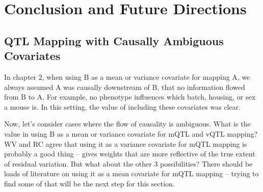 \chapter{Conclusion and Future Directions}

\section{QTL Mapping with Causally Ambiguous Covariates}

In chapter 2, when using B as a mean or variance covariate for mapping A, we always assumed A was causally downstream of B, that no information flowed from B to A.
For example, no phenotype influences which batch, housing, or sex a mouse is.
In this setting, the value of including these covariates was clear.

Now, let's consider cases where the flow of causality is ambiguous.
What is the value in using B as a mean or variance covariate for mQTL and vQTL mapping?
WV and RC agree that using it as a variance covariate for mQTL mapping is probably a good thing -- gives weights that are more reflective of the true extent of residual variation.
But what about the other 3 possibilities?
There should be loads of literature on using it as a mean covariate for mQTL mapping -- trying to find some of that will be the next step for this section.


